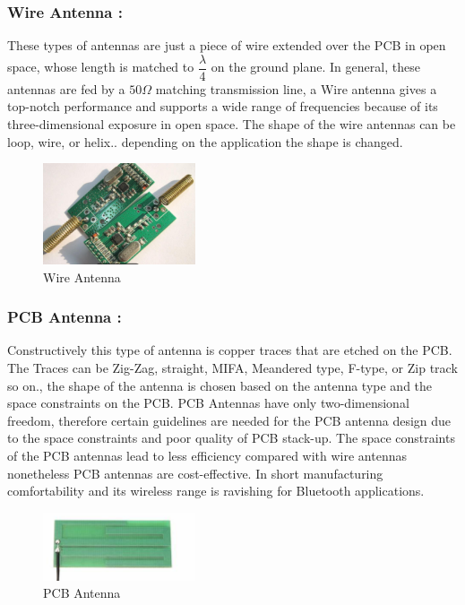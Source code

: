 \subsubsection{Wire Antenna :}
These types of antennas are just a piece of wire extended over the PCB in open space, whose length is matched to $\dfrac{\lambda}{4}$ on the ground plane.
In general, these antennas are fed by a $50\Omega  $ matching transmission line, a Wire antenna gives a top-notch performance and supports a wide range of frequencies because of its three-dimensional exposure in open space.
The shape of the wire antennas can be loop, wire, or helix.. depending on the application the shape is changed.

\begin{figure}[h]
	\centering
	\includegraphics[width=0.4\textwidth]{Chap03/Figures/Wire_antenna.PNG}
	\caption{Wire Antenna}
	\label{WIRE_ANTENNA}
\end{figure}


\subsubsection{ PCB Antenna :}Constructively this type of antenna is copper traces
that are etched on the PCB. The Traces can be Zig-Zag, straight, MIFA, Meandered type, F-type, or Zip track so on.,
the shape of the antenna is chosen based on the antenna type and the space constraints on the PCB. PCB Antennas have only two-dimensional freedom, therefore certain guidelines are needed for the PCB antenna design due to the space constraints and poor quality of PCB stack-up.
The space constraints of the PCB antennas lead to less efficiency compared with wire antennas nonetheless PCB antennas are cost-effective.
In short manufacturing comfortability and its wireless range is ravishing for Bluetooth applications.

\begin{figure}[h]
	\centering
	\includegraphics[width=0.4\textwidth]{Chap03/Figures/PCB_Antenna.PNG}
	\caption{PCB Antenna}
	\label{PCB_ANTENNA}
\end{figure}


